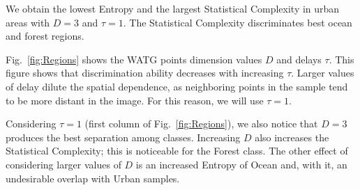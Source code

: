 \documentclass[journal]{IEEEtran}
\begin{document}
We obtain the lowest Entropy and the largest Statistical Complexity
in urban areas 	with $ D = 3 $ and $ \tau = 1 $.
The Statistical Complexity discriminates best ocean and forest regions.

Fig.~\ref{fig:Regions} shows the WATG points dimension values $D$ and delays $\tau$.
%
This figure shows that discrimination ability decreases with increasing $\tau$.
Larger values of delay dilute the spatial dependence, as neighboring points in the sample tend to be more distant in the image.
For this reason, we will use $\tau=1$.

Considering $\tau=1$ (first column of Fig.~\ref{fig:Regions}), 
we also notice that $D=3$ produces the best separation among classes.
Increasing $D$ also increases the Statistical Complexity; this is noticeable for the Forest class.
The other effect of considering larger values of $D$ is an increased Entropy of Ocean and, with it, an undesirable overlap with Urban samples.

\end{document}
